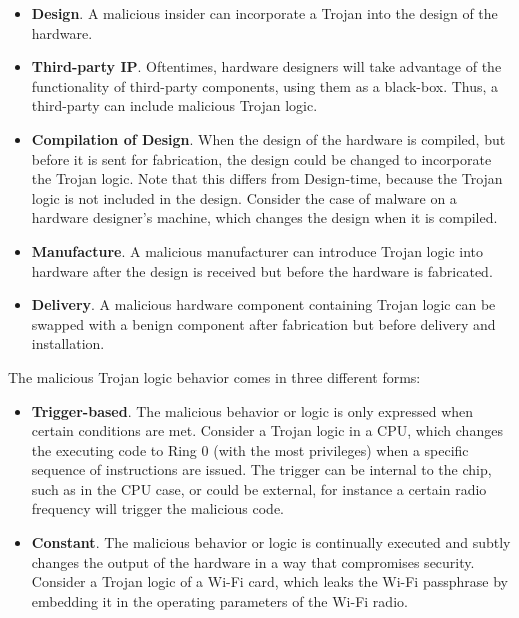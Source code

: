 \documentclass[11pt,letterpaper]{article}
\begin{document}
\begin{itemize}

\item \textbf{Design}. A malicious insider can incorporate a Trojan into the
  design of the hardware.

\item \textbf{Third-party IP}. Oftentimes, hardware designers will take
  advantage of the functionality of third-party components, using them
  as a black-box. Thus, a third-party can include malicious Trojan
  logic.

\item \textbf{Compilation of Design}. When the design of the hardware is
  compiled, but before it is sent for fabrication, the design could be
  changed to incorporate the Trojan logic. Note that this differs from
  Design-time, because the Trojan logic is not included in the design.
  Consider the case of malware on a hardware designer's machine, which
  changes the design when it is compiled.

\item \textbf{Manufacture}. A malicious manufacturer can introduce Trojan logic into hardware after the design is received but before the hardware
is fabricated.

\item \textbf{Delivery}. A malicious hardware component containing Trojan logic can be swapped with a benign component after fabrication but before
delivery and installation.
  
\end{itemize}

The malicious Trojan logic behavior comes in three different forms:

\begin{itemize}

\item \textbf{Trigger-based}. The malicious behavior or logic is only expressed when certain conditions are met. Consider a Trojan logic in a CPU,
  which changes the executing code to Ring 0 (with the most
  privileges) when a specific sequence of instructions are issued. The
  trigger can be internal to the chip, such as in the CPU case, or
  could be external, for instance a certain radio frequency will
  trigger the malicious code.

\item \textbf{Constant}. The malicious behavior or logic is continually
  executed and subtly changes the output of the hardware in a way that
  compromises security. Consider a Trojan logic of a Wi-Fi card, which
  leaks the Wi-Fi passphrase by embedding it in the operating
  parameters of the Wi-Fi radio.
  
\end{itemize}
\end{document}
